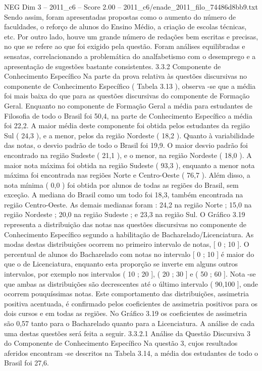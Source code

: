 \begin{textsample}{NEG Dim 3 – 2011\_c6 – Score 2.00 – 2011\_c6/enade\_2011\_filo\_74486d8bb9.txt}
Sendo assim, foram apresentadas propostas como o aumento do número de faculdades, o reforço de alunos do Ensino Médio, a criação de escolas técnicas, etc.
Por outro lado, houve um grande número de redações bem escritas e precisas, no que se refere ao que foi exigido pela questão.
Foram análises equilibradas e sensatas, correlacionando a problemática do analfabetismo com o desemprego e a apresentação de sugestões bastante consistentes. 3.3.2 Componente de Conhecimento Específico Na parte da prova relativa às questões discursivas no componente de Conhecimento Específico ( Tabela 3.13 ), observa -se que a média foi mais baixa do que para as questões discursivas do componente de Formação Geral.
Enquanto no componente de Formação Geral a média para estudantes de Filosofia de todo o Brasil foi 50,4, na parte de Conhecimento Específico a média foi 22,2.
A maior média deste componente foi obtida pelos estudantes da região Sul ( 24,3 ), e a menor, pelos da região Nordeste ( 18,2 ).
Quanto à variabilidade das notas, o desvio padrão de todo o Brasil foi 19,9.
O maior desvio padrão foi encontrado na região Sudeste ( 21,1 ), e o menor, na região Nordeste ( 18,0 ).
A maior nota máxima foi obtida na região Sudeste ( 93,3 ), enquanto a menor nota máxima foi encontrada nas regiões Norte e Centro-Oeste ( 76,7 ).
Além disso, a nota mínima ( 0,0 ) foi obtida por alunos de todas as regiões do Brasil, sem exceção.
A mediana do Brasil como um todo foi 18,3, também encontrada na região Centro-Oeste.
As demais medianas foram : 24,2 na região Norte ; 15,0 na região Nordeste ; 20,0 na região Sudeste ; e 23,3 na região Sul.
O Gráfico 3.19 representa a distribuição das notas nas questões discursivas no componente de Conhecimento Específico segundo a habilitação de Bacharelado/Licenciatura.
As modas destas distribuições ocorrem no primeiro intervalo de notas, [ 0 ; 10 ].
O percentual de alunos do Bacharelado com notas no intervalo [ 0 ; 10 ] é maior do que o de Licenciatura, enquanto esta proporção se inverte em alguns outros intervalos, por exemplo nos intervalos ( 10 ; 20 ], ( 20 ; 30 ] e ( 50 ; 60 ].
Nota -se que ambas as distribuições são decrescentes até o último intervalo ( 90,100 ], onde ocorrem pouquíssimas notas.
Este comportamento das distribuições, assimetria positiva acentuada, é confirmado pelos coeficientes de assimetria positivos para os dois cursos e em todas as regiões.
No Gráfico 3.19 os coeficientes de assimetria são 0,57 tanto para o Bacharelado quanto para a Licenciatura.
A análise de cada uma destas questões será feita a seguir. 3.3.2.1 Análise da Questão Discursiva 3 do Componente de Conhecimento Específico Na questão 3, cujos resultados aferidos encontram -se descritos na Tabela 3.14, a média dos estudantes de todo o Brasil foi 27,6.

\end{textsample}

